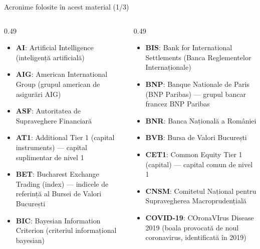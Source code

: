 
{
\begin{frame}[noframenumbering]
    \titlepage
\end{frame}
}
\begin{frame}{Acronime folosite în acest material (1/3)}
\begin{columns}[T]
\begin{column}{0.49\textwidth}
\begin{itemize}\setlength{\itemsep}{0pt}
    \item \textbf{AI}: Artificial Intelligence (inteligență artificială)
    \item \textbf{AIG}: American International Group (grupul american de asigurări AIG)
    \item \textbf{ASF}: Autoritatea de Supraveghere Financiară
    \item \textbf{AT1}: Additional Tier 1 (capital instruments) — capital suplimentar de nivel 1
    \item \textbf{BET}: Bucharest Exchange Trading (index) — indicele de referință al Bursei de Valori București
    \item \textbf{BIC}: Bayesian Information Criterion (criteriul informațional bayesian)
\end{itemize}
\end{column}
\begin{column}{0.49\textwidth}
\begin{itemize}\setlength{\itemsep}{0pt}
    \item \textbf{BIS}: Bank for International Settlements (Banca Reglementelor Internaționale)
    \item \textbf{BNP}: Banque Nationale de Paris (BNP Paribas) — grupul bancar francez BNP Paribas
    \item \textbf{BNR}: Banca Națională a României
    \item \textbf{BVB}: Bursa de Valori București
    \item \textbf{CET1}: Common Equity Tier 1 (capital) — capital comun de nivel 1
    \item \textbf{CNSM}: Comitetul Național pentru Supravegherea Macroprudențială
    \item \textbf{COVID-19}: COronaVIrus Disease 2019 (boala provocată de noul coronavirus, identificată în 2019)
\end{itemize}
\end{column}
\end{columns}
\end{frame}
